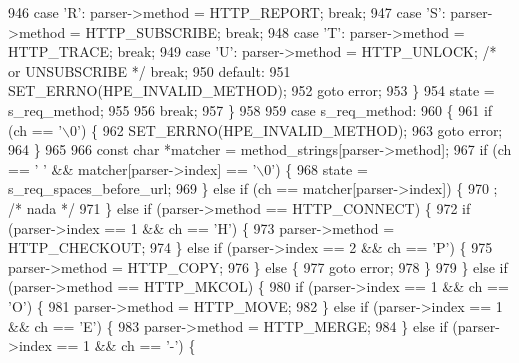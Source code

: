 \begin{DoxyCode}
946           \textcolor{keywordflow}{case} \textcolor{charliteral}{'R'}: parser->method = HTTP_REPORT; \textcolor{keywordflow}{break};
947           \textcolor{keywordflow}{case} \textcolor{charliteral}{'S'}: parser->method = HTTP_SUBSCRIBE; \textcolor{keywordflow}{break};
948           \textcolor{keywordflow}{case} \textcolor{charliteral}{'T'}: parser->method = HTTP_TRACE; \textcolor{keywordflow}{break};
949           \textcolor{keywordflow}{case} \textcolor{charliteral}{'U'}: parser->method = HTTP_UNLOCK; \textcolor{comment}{/* or UNSUBSCRIBE */} \textcolor{keywordflow}{break};
950           \textcolor{keywordflow}{default}:
951             SET_ERRNO(HPE_INVALID_METHOD);
952             \textcolor{keywordflow}{goto} error;
953         \}
954         state = s_req_method;
955 
956         \textcolor{keywordflow}{break};
957       \}
958 
959       \textcolor{keywordflow}{case} s_req_method:
960       \{
961         \textcolor{keywordflow}{if} (ch == \textcolor{charliteral}{'\(\backslash\)0'}) \{
962           SET_ERRNO(HPE_INVALID_METHOD);
963           \textcolor{keywordflow}{goto} error;
964         \}
965 
966         \textcolor{keyword}{const} \textcolor{keywordtype}{char} *matcher = method_strings[parser->method];
967         \textcolor{keywordflow}{if} (ch == \textcolor{charliteral}{' '} && matcher[parser->index] == \textcolor{charliteral}{'\(\backslash\)0'}) \{
968           state = s_req_spaces_before_url;
969         \} \textcolor{keywordflow}{else} \textcolor{keywordflow}{if} (ch == matcher[parser->index]) \{
970           ; \textcolor{comment}{/* nada */}
971         \} \textcolor{keywordflow}{else} \textcolor{keywordflow}{if} (parser->method == HTTP_CONNECT) \{
972           \textcolor{keywordflow}{if} (parser->index == 1 && ch == \textcolor{charliteral}{'H'}) \{
973             parser->method = HTTP_CHECKOUT;
974           \} \textcolor{keywordflow}{else} \textcolor{keywordflow}{if} (parser->index == 2  && ch == \textcolor{charliteral}{'P'}) \{
975             parser->method = HTTP_COPY;
976           \} \textcolor{keywordflow}{else} \{
977             \textcolor{keywordflow}{goto} error;
978           \}
979         \} \textcolor{keywordflow}{else} \textcolor{keywordflow}{if} (parser->method == HTTP_MKCOL) \{
980           \textcolor{keywordflow}{if} (parser->index == 1 && ch == \textcolor{charliteral}{'O'}) \{
981             parser->method = HTTP_MOVE;
982           \} \textcolor{keywordflow}{else} \textcolor{keywordflow}{if} (parser->index == 1 && ch == \textcolor{charliteral}{'E'}) \{
983             parser->method = HTTP_MERGE;
984           \} \textcolor{keywordflow}{else} \textcolor{keywordflow}{if} (parser->index == 1 && ch == \textcolor{charliteral}{'-'}) \{

\end{DoxyCode}

